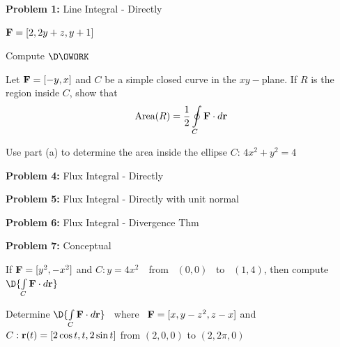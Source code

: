 \documentclass[12pt]{amsart}
\numberwithin{equation}{section}
\begin{document}
 
\thispagestyle{empty}
\newpage
\thispagestyle{empty}

{\bf Problem 1:} Line Integral - Directly

$\text{\bf F} = [2,2y+z,y+1]$  

\vspace{0.2cm}

%
%
%
%
%

\vspace{0.2cm}

Compute \quad $\D \OWORK $

Let ${\bf F} = [-y,x]$ and $C$ be a simple closed curve in the $xy-$plane. If $R$ is the region inside $C$, show that 
$$
\text{Area}(R) = \frac{1}{2}\oint \limits_{C} \text{\bf F} \cdot d\text{\bf r}
$$

Use part (a) to determine the area inside the ellipse $C$: $4x^2 + y^2 = 4$

\vspace{0.2cm}

{\bf Problem 4:} Flux Integral - Directly

\vspace{0.2cm}

{\bf Problem 5:} Flux Integral - Directly with unit normal

\vspace{0.2cm}

{\bf Problem 6:} Flux Integral - Divergence Thm

\vspace{0.2cm}

{\bf Problem 7:} Conceptual

\EX If $\text{\bf F} = [y^2,-x^2]$ and $C: y = 4x^2$ \,\, from \, $(0,0)$ \, to \, $(1,4)$, then compute $\D{ \int \limits_{C} \text{\bf F} \cdot d\text{\bf r}}$

\vspace{0.2cm}

\EX	Determine $\D{ \int \limits_{C} \text{\bf F} \cdot d\text{\bf r}}$ \, where \, $\text{\bf F} = [x,y-z^2,z-x]$ and $C: \text{\bf r}(t) = [2\cos t, t, 2\sin t]$ from $(2,0,0)$ to $(2,2\pi,0)$

\vspace{0.2cm}
\end{document}
